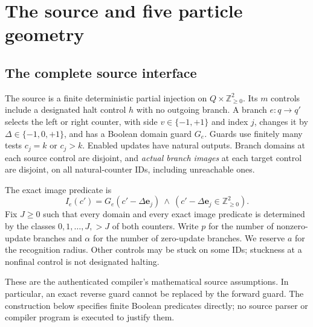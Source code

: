 \documentclass[11pt,a4paper]{article}
\numberwithin{equation}{section}
\newcommand{\Nge}{\mathbb Z_{\ge0}}\newcommand{\Nzero}{\mathbb N_0}
\begin{document}
\section{The source and five particle geometry}\label{fpa:tr:sec:source}
\subsection{The complete source interface}
The source is a finite deterministic partial injection on $Q\times\Nge^2$. Its $m$ controls include a designated halt control $h$ with no outgoing branch. A branch $e:q\to q'$ selects the left or right counter, with side $v\in\{-1,+1\}$ and index $j$, changes it by $\Delta\in\{-1,0,+1\}$, and has a Boolean domain guard $G_e$. Guards use finitely many tests $c_j=k$ or $c_j>k$. Enabled updates have natural outputs. Branch domains at each source control are disjoint, and \emph{actual branch images} at each target control are disjoint, on all natural-counter IDs, including unreachable ones.

The exact image predicate is
\begin{equation}\label{fpa:tr:eq:image-guard}
I_e(c')=G_e(c'-\Delta\mathbf e_j)\ \wedge\ (c'-\Delta\mathbf e_j\in\Nge^2).
\end{equation}
Fix $J\ge0$ such that every domain and every exact image predicate is determined by the classes $0,1,\ldots,J,>J$ of both counters. Write $p$ for the number of nonzero-update branches and $\alpha$ for the number of zero-update branches. We reserve $a$ for the recognition radius. Other controls may be stuck on some IDs; stuckness at a nonfinal control is not designated halting.

These are the authenticated compiler's mathematical source assumptions. In particular, an exact reverse guard cannot be replaced by the forward guard. The construction below specifies finite Boolean predicates directly; no source parser or compiler program is executed to justify them.
\end{document}
